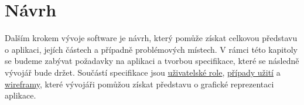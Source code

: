 \chapter{Návrh}
\label{ch:design}
Dalším krokem vývoje software je návrh, který pomůže získat celkovou představu o aplikaci, jejích částech a případně problémových místech. V rámci této kapitoly se budeme zabývat požadavky na aplikaci a tvorbou specifikace, které se následně vývojář bude držet. Součástí specifikace jsou \hyperref[sc:user_roles]{uživatelské role}, \hyperref[sc:use_cases]{případy užití} a \hyperref[sc:wireframes]{wireframy}, které vývojáři pomůžou získat představu o grafické reprezentaci aplikace.











